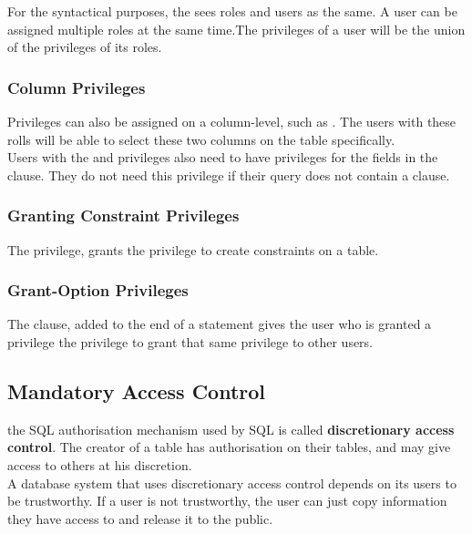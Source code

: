 \documentclass[11pt,a4paper,twocolumn]{book}
\begin{document}
For the syntactical purposes, the  sees roles and users as the same. A user can be assigned multiple roles at the same time.The privileges of a user will be the union of the privileges of its roles.

\subsubsection{Column Privileges}

Privileges can also be assigned on a column-level, such as . The users with these rolls will be able to select these two columns on the  table specifically.\\

Users with the  and  privileges also need to have  privileges for the fields in the  clause. They do not need this privilege if their query does not contain a  clause.\\

\subsubsection{Granting Constraint Privileges}

The  privilege, grants the privilege to create constraints on a table.

\subsubsection{Grant-Option Privileges}

The  clause, added to the end of a  statement gives the user who is granted a privilege the privilege to grant that same privilege to other users.

\subsection{Mandatory Access Control}

the SQL authorisation mechanism used by SQL is called \textbf{discretionary access control}. The creator of a table has authorisation on their tables, and may give access to others at his discretion.\\

A database system that uses discretionary access control depends on its users to be trustworthy. If a user is not trustworthy, the user can just copy information they have access to and release it to the public.\\
\end{document}
